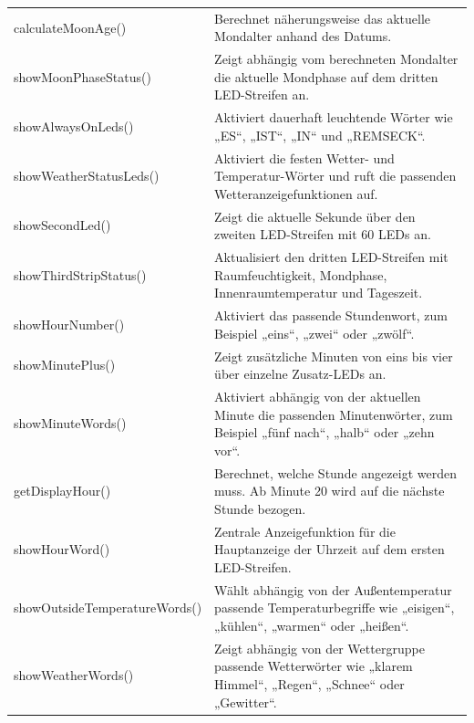 \begin{longtable}{p{} p{}}
{\small\ttfamily calculateMoonAge()} &
Berechnet näherungsweise das aktuelle Mondalter anhand des Datums. \\

{\small\ttfamily showMoonPhaseStatus()} &
Zeigt abhängig vom berechneten Mondalter die aktuelle Mondphase auf dem dritten LED-Streifen an. \\

{\small\ttfamily showAlwaysOnLeds()} &
Aktiviert dauerhaft leuchtende Wörter wie „ES“, „IST“, „IN“ und „REMSECK“. \\

{\small\ttfamily showWeatherStatusLeds()} &
Aktiviert die festen Wetter- und Temperatur-Wörter und ruft die passenden Wetteranzeigefunktionen auf. \\

{\small\ttfamily showSecondLed()} &
Zeigt die aktuelle Sekunde über den zweiten LED-Streifen mit 60 LEDs an. \\

{\small\ttfamily showThirdStripStatus()} &
Aktualisiert den dritten LED-Streifen mit Raumfeuchtigkeit, Mondphase, Innenraumtemperatur und Tageszeit. \\

{\small\ttfamily showHourNumber()} &
Aktiviert das passende Stundenwort, zum Beispiel „eins“, „zwei“ oder „zwölf“. \\

{\small\ttfamily showMinutePlus()} &
Zeigt zusätzliche Minuten von eins bis vier über einzelne Zusatz-LEDs an. \\

{\small\ttfamily showMinuteWords()} &
Aktiviert abhängig von der aktuellen Minute die passenden Minutenwörter, zum Beispiel „fünf nach“, „halb“ oder „zehn vor“. \\

{\small\ttfamily getDisplayHour()} &
Berechnet, welche Stunde angezeigt werden muss. Ab Minute 20 wird auf die nächste Stunde bezogen. \\

{\small\ttfamily showHourWord()} &
Zentrale Anzeigefunktion für die Hauptanzeige der Uhrzeit auf dem ersten LED-Streifen. \\

{\small\ttfamily showOutsideTemperatureWords()} &
Wählt abhängig von der Außentemperatur passende Temperaturbegriffe wie „eisigen“, „kühlen“, „warmen“ oder „heißen“. \\

{\small\ttfamily showWeatherWords()} &
Zeigt abhängig von der Wettergruppe passende Wetterwörter wie „klarem Himmel“, „Regen“, „Schnee“ oder „Gewitter“. \\

\end{longtable}






